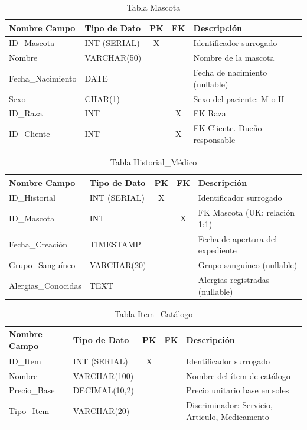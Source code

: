 \begin{table}[H]
\centering
\footnotesize
\begin{tabular}{|l|l|c|c|p{5cm}|}
\hline
\textbf{Nombre Campo} & \textbf{Tipo de Dato} & \textbf{PK} & \textbf{FK} & \textbf{Descripción} \\
\hline
ID\_Mascota & INT (SERIAL) & X & & Identificador surrogado \\
\hline
Nombre & VARCHAR(50) & & & Nombre de la mascota \\
\hline
Fecha\_Nacimiento & DATE & & & Fecha de nacimiento (nullable) \\
\hline
Sexo & CHAR(1) & & & Sexo del paciente: M o H \\
\hline
ID\_Raza & INT & & X & FK Raza \\
\hline
ID\_Cliente & INT & & X & FK Cliente. Dueño responsable \\
\hline
\end{tabular}
\caption{Tabla Mascota}
\end{table}

\begin{table}[H]
\centering
\footnotesize
\begin{tabular}{|l|l|c|c|p{5cm}|}
\hline
\textbf{Nombre Campo} & \textbf{Tipo de Dato} & \textbf{PK} & \textbf{FK} & \textbf{Descripción} \\
\hline
ID\_Historial & INT (SERIAL) & X & & Identificador surrogado \\
\hline
ID\_Mascota & INT & & X & FK Mascota (UK: relación 1:1) \\
\hline
Fecha\_Creación & TIMESTAMP & & & Fecha de apertura del expediente \\
\hline
Grupo\_Sanguíneo & VARCHAR(20) & & & Grupo sanguíneo (nullable) \\
\hline
Alergias\_Conocidas & TEXT & & & Alergias registradas (nullable) \\
\hline
\end{tabular}
\caption{Tabla Historial\_Médico}
\end{table}

\begin{table}[H]
\centering
\footnotesize
\begin{tabular}{|l|l|c|c|p{5cm}|}
\hline
\textbf{Nombre Campo} & \textbf{Tipo de Dato} & \textbf{PK} & \textbf{FK} & \textbf{Descripción} \\
\hline
ID\_Item & INT (SERIAL) & X & & Identificador surrogado \\
\hline
Nombre & VARCHAR(100) & & & Nombre del ítem de catálogo \\
\hline
Precio\_Base & DECIMAL(10,2) & & & Precio unitario base en soles \\
\hline
Tipo\_Item & VARCHAR(20) & & & Discriminador: Servicio, Articulo, Medicamento \\
\hline
\end{tabular}
\caption{Tabla Item\_Catálogo}
\end{table}

